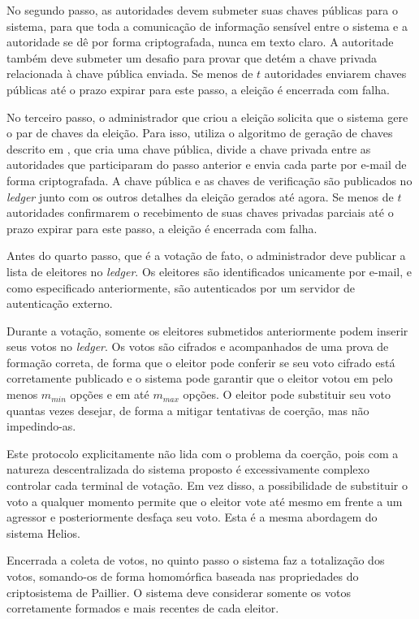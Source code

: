 No segundo passo, as autoridades devem submeter suas chaves públicas para o
sistema, para que toda a comunicação de informação sensível entre o sistema e a
autoridade se dê por forma criptografada, nunca em texto claro. A autoritade
também deve submeter um desafio para provar que detém a chave privada
relacionada à chave pública enviada. Se menos de $t$ autoridades enviarem
chaves públicas até o prazo expirar para este passo, a eleição é encerrada com
falha.

No terceiro passo, o administrador que criou a eleição solicita que o sistema
gere o par de chaves da eleição. Para isso, utiliza o algoritmo de geração de
chaves descrito em \textcite{fouque2000sharing}, que cria uma chave pública,
divide a chave privada entre as autoridades que participaram do passo anterior
e envia cada parte por e-mail de forma criptografada. A chave pública e as
chaves de verificação são publicados no \textit{ledger} junto com os outros
detalhes da eleição gerados até agora. Se menos de $t$ autoridades confirmarem
o recebimento de suas chaves privadas parciais até o prazo expirar para este
passo, a eleição é encerrada com falha.

Antes do quarto passo, que é a votação de fato, o administrador deve publicar a
lista de eleitores no \textit{ledger}. Os eleitores são identificados
unicamente por e-mail, e como especificado anteriormente, são autenticados por
um servidor de autenticação externo.

Durante a votação, somente os eleitores submetidos anteriormente podem inserir
seus votos no \textit{ledger}. Os votos são cifrados e acompanhados de uma
prova de formação correta, de forma que o eleitor pode conferir se seu voto
cifrado está corretamente publicado e o sistema pode garantir que o eleitor
votou em pelo menos $m_{min}$ opções e em até $m_{max}$ opções. O eleitor pode
substituir seu voto quantas vezes desejar, de forma a mitigar tentativas de
coerção, mas não impedindo-as.

Este protocolo explicitamente não lida com o problema da coerção, pois com a
natureza descentralizada do sistema proposto é excessivamente complexo
controlar cada terminal de votação. Em vez disso, a possibilidade de substituir
o voto a qualquer momento permite que o eleitor vote até mesmo em frente a um
agressor e posteriormente desfaça seu voto. Esta é a mesma abordagem do sistema
Helios.

Encerrada a coleta de votos, no quinto passo o sistema faz a totalização dos
votos, somando-os de forma homomórfica baseada nas propriedades do
criptosistema de Paillier. O sistema deve considerar somente os votos
corretamente formados e mais recentes de cada eleitor.

